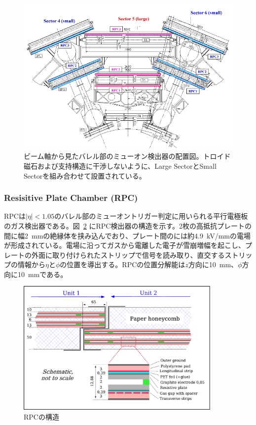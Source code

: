 \begin{figure}[tb]
  \centering
  \includegraphics[clip, width=12cm]{fig/2/RPC_xy.pdf}
  \caption{ビーム軸から見たバレル部のミューオン検出器の配置図\cite{Aad:1129811}。トロイド磁石および支持構造に干渉しないように、Large SectorとSmall Sectorを組み合わせて設置されている。}
  \label{fig:ミューオン検出器_バレル部}
\end{figure}


\subsubsection{Resisitive Plate Chamber (RPC)}
RPCは$|\eta| < 1.05$のバレル部のミューオントリガー判定に用いられる平行電極板のガス検出器である。図~\ref{fig:RPC} にRPC検出器の構造を示す。2枚の高抵抗プレートの間に幅2~mmの絶縁体を挟み込んでおり、プレート間のには約4.9~kV/mmの電場が形成されている。電場に沿ってガスから電離した電子が雪崩増幅を起こし、プレートの外面に取り付けられたストリップで信号を読み取り、直交するストリップの情報から$\eta$と$\phi$の位置を導出する。RPCの位置分解能は$z$方向に10~mm、$\phi$方向に10~mmである。

\begin{figure}[tb]
  \centering
  \includegraphics[clip, width=10cm]{fig/2/RPC_structure.pdf}
  \caption{RPCの構造\cite{Aad:1129811}}
  \label{fig:RPC}
\end{figure}

